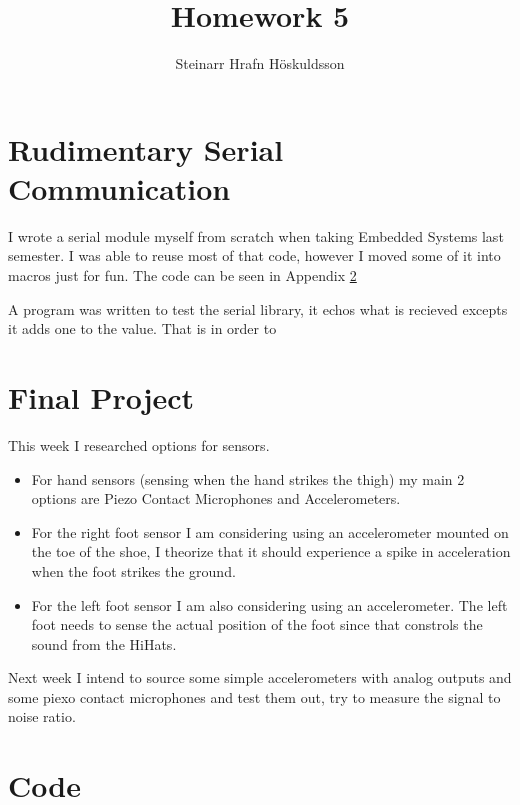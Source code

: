 \documentclass{article}
\title{Homework 5}
\author{Steinarr Hrafn Höskuldsson}
\newcommand{\mycomment}[1]{}
\begin{document}
\mycomment{

\begin{figure}[h]
    \centering
    \texttt{[image: LAB3/Basic1.png]}
    \caption{"Switch test" Breadboard set up}
    \label{fig:Switch_test}
\end{figure}



} %

\pagestyle{firststyle}
{\let\newpage\relax\maketitle}

\section{Rudimentary Serial Communication}
I wrote a serial module myself from scratch when taking Embedded Systems last semester. I was able to reuse most of that code, however I moved some of it into macros just for fun. The code can be seen in Appendix \ref{appendix:code}

A program was written to test the serial library, it echos what is recieved excepts it adds one to the value. That is in order to  



\section*{Final Project}

This week I researched options for sensors.
\begin{itemize}
    \item  For hand sensors (sensing when the hand strikes the thigh) my main 2 options are Piezo Contact Microphones and Accelerometers.

\item For the right foot sensor I am considering using an accelerometer mounted on the toe of the shoe, I theorize that it should experience a spike in acceleration when the foot strikes the ground.

\item For the left foot sensor I am also considering using an accelerometer. The left foot needs to sense the actual position of the foot since that constrols the sound from the HiHats. 

\end{itemize}
Next week I intend to source some simple accelerometers with analog outputs and some piexo contact microphones and test them out, try to measure the signal to noise ratio.

\newpage
\appendix
\section{Code}\label{appendix:code}


\end{document}
